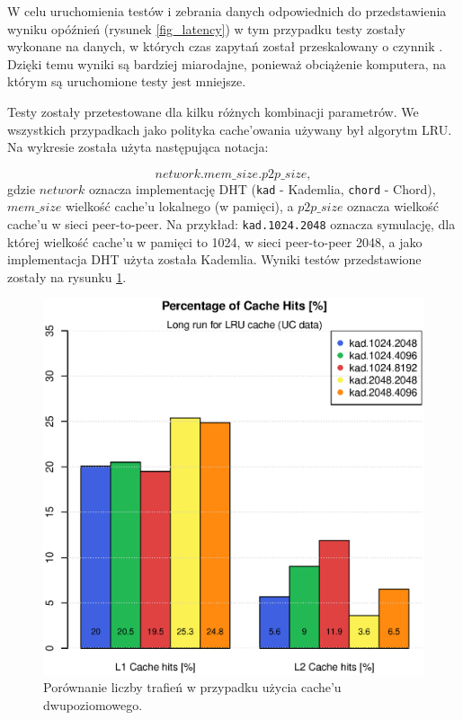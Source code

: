 \documentclass[a4paper,11pt]{scrartcl}
\newcommand{\f}{\texttt}
\newcommand{\s}{ }
\newcommand{\keszu}{cache'u}
\newcommand{\keszowania}{cache'owania}
\begin{document}
W celu uruchomienia testów i zebrania danych odpowiednich do przedstawienia wyniku opóźnień (rysunek \ref{fig_latency}) w tym przypadku testy zostały wykonane na danych, w których czas zapytań został przeskalowany o czynnik . Dzięki temu wyniki są bardziej miarodajne, ponieważ obciążenie komputera, na którym są uruchomione testy jest mniejsze. 

Testy zostały przetestowane dla kilku różnych kombinacji parametrów. We wszystkich przypadkach jako polityka \keszowania\s używany był algorytm LRU. Na wykresie została użyta następująca notacja:

\begin{equation*}
network.mem\_size.p2p\_size,
\end{equation*}
gdzie $network$ oznacza implementację DHT (\f{kad} - Kademlia, \f{chord} - Chord), $mem\_size$ wielkość \keszu\s lokalnego (w pamięci), a $p2p\_size$ oznacza wielkość \keszu\s w sieci peer-to-peer. Na przykład: \f{kad.1024.2048} oznacza symulację, dla której wielkość \keszu\s w pamięci to 1024, w sieci peer-to-peer 2048, a jako implementacja DHT użyta została Kademlia. Wyniki testów przedstawione zostały na rysunku \ref{fig_long_all}.

\begin{figure}[h!]
\centering
\includegraphics[width=0.7\linewidth]{img/tests/long_kad_1.eps}
\caption{Porównanie liczby trafień w przypadku użycia \keszu\s dwupoziomowego.}
\label{fig_long_all}
\end{figure}
\end{document}
